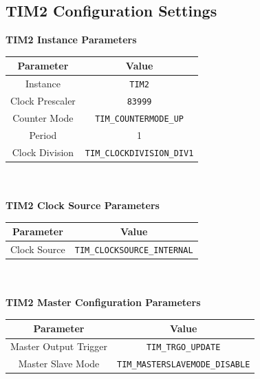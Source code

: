 \documentclass[12pt]{report}
\begin{document}
\begin{appendix}
	\chapter{TIM2 Configuration Settings}\label{appendixtim2}
	\textbf{TIM2 Instance Parameters}\\
	\begin{tabular}{|c|c|}
		\hline
		Parameter & Value\\\hline
		Instance & \texttt{TIM2}\\\hline
		Clock Prescaler & \texttt{83999}\\\hline
		Counter Mode & \texttt{TIM\_COUNTERMODE\_UP}\\\hline
		Period & 1\\\hline
		Clock Division & \texttt{TIM\_CLOCKDIVISION\_DIV1}\\\hline
	\end{tabular}
	\newline
	\\\\
	\textbf{TIM2 Clock Source Parameters}\\
	\begin{tabular}{|c|c|}
		\hline
		Parameter & Value\\\hline
		Clock Source & \texttt{TIM\_CLOCKSOURCE\_INTERNAL}\\\hline
	\end{tabular}
	\newline
	\\\\
	\textbf{TIM2 Master Configuration Parameters}\\
	\begin{tabular}{|c|c|}
		\hline
		Parameter & Value\\\hline
		Master Output Trigger & \texttt{TIM\_TRGO\_UPDATE}\\\hline
		Master Slave Mode & \texttt{TIM\_MASTERSLAVEMODE\_DISABLE}\\\hline
	\end{tabular}
	\newpage
	

\end{appendix}
\end{document}
